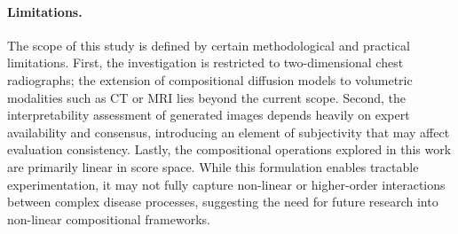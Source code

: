 \paragraph{Limitations.}
The scope of this study is defined by certain methodological and practical limitations.  
First, the investigation is restricted to two-dimensional chest radiographs; the extension of compositional diffusion models to volumetric modalities such as CT or MRI lies beyond the current scope.  
Second, the interpretability assessment of generated images depends heavily on expert availability and consensus, introducing an element of subjectivity that may affect evaluation consistency.  
Lastly, the compositional operations explored in this work are primarily linear in score space.  
While this formulation enables tractable experimentation, it may not fully capture non-linear or higher-order interactions between complex disease processes, suggesting the need for future research into non-linear compositional frameworks.



